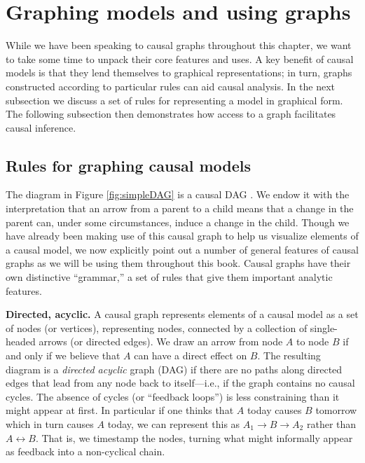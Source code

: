 \documentclass[
  12pt,
]{book}
\begin{document}
\hypertarget{graphing-models-and-using-graphs}{%
\section{Graphing models and using graphs}\label{graphing-models-and-using-graphs}}

While we have been speaking to causal graphs throughout this chapter, we want to take some time to unpack their core features and uses. A key benefit of causal models is that they lend themselves to graphical representations; in turn, graphs constructed according to particular rules can aid causal analysis. In the next subsection we discuss a set of rules for representing a model in graphical form. The following subsection then demonstrates how access to a graph facilitates causal inference.

\hypertarget{graphing}{%
\subsection{Rules for graphing causal models}\label{graphing}}

The diagram in Figure \ref{fig:simpleDAG} is a causal DAG \citep{hernan2006instruments}. We endow it with the interpretation that an arrow from a parent to a child means that a change in the parent can, under some circumstances, induce a change in the child. Though we have already been making use of this causal graph to help us visualize elements of a causal model, we now explicitly point out a number of general features of causal graphs as we will be using them throughout this book. Causal graphs have their own distinctive ``grammar,'' a set of rules that give them important analytic features.

\textbf{Directed, acyclic.} A causal graph represents elements of a causal model as a set of nodes (or vertices), representing nodes, connected by a collection of single-headed arrows (or directed edges). We draw an arrow from node \(A\) to node \(B\) if and only if we believe that \(A\) can have a direct effect on \(B\). The resulting diagram is a \emph{directed acyclic} graph (DAG) if there are no paths along directed edges that lead from any node back to itself---i.e., if the graph contains no causal cycles. The absence of cycles (or ``feedback loops'') is less constraining than it might appear at first. In particular if one thinks that \(A\) today causes \(B\) tomorrow which in turn causes \(A\) today, we can represent this as \(A_1 \rightarrow B \rightarrow A_2\) rather than \(A \leftrightarrow B\). That is, we timestamp the nodes, turning what might informally appear as feedback into a non-cyclical chain.
\end{document}
